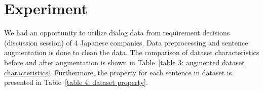 \documentclass[10pt, conference, compsocconf]{IEEEtran}
\begin{document}
\section{Experiment}
We had an opportunity to utilize dialog data from requirement decisions (discussion session) of 4 Japanese companies. Data preprocessing and sentence augmentation is done to clean the data. The comparison of dataset characteristics before and after augmentation is shown in Table~\ref{table 3: augmented dataset characteristics}. Furthermore, the property for each sentence in dataset is presented in Table~\ref{table 4: dataset property}.

\begin{table}[b]
\caption{Augmented Dataset Characteristics}
\label{table 3: augmented dataset characteristics}
\end{table}
\end{document}

